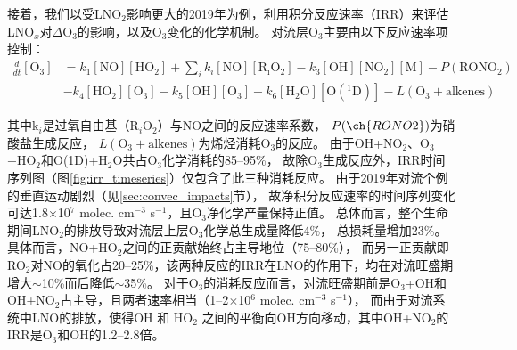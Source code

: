 
接着，我们以受LNO$_2$影响更大的2019年为例，利用积分反应速率（IRR）来评估LNO$_x$对$\Delta$O$_3$的影响，以及O$_3$变化的化学机制。
对流层O$_3$主要由以下反应速率项控制\citep{Mazzuca.2016}：
{
\abovedisplayskip=3pt%
\belowdisplayskip=3pt%
\begingroup
\allowdisplaybreaks
\begin{align}
  \frac{d}{dt}[\mathrm{O_3}] &= k_1[\mathrm{NO}][\mathrm{HO_2}] + \sum_{i}  k_i[\mathrm{NO}][\mathrm{R_iO_2}] - k_3[\mathrm{OH}][\mathrm{NO_2}][\mathrm{M}] - P(\mathrm{RONO_2}) \nonumber \\
                             & - k_4[\mathrm{HO_2}][\mathrm{O_3}] - k_5[\mathrm{OH}][\mathrm{O_3}] - k_6[\mathrm{H_2O}][\mathrm{O(^1D)}] - L(\mathrm{O_3+alkenes})
\end{align}
\endgroup
}

其中k$_i$是过氧自由基（R$_i$O$_2$）与NO之间的反应速率系数，
$P(\ch{RONO2})$为硝酸盐生成反应，
$L(\mathrm{O_3+alkenes})$为烯烃消耗O$_3$的反应。
由于OH+NO$_2$、O$_3$+HO$_2$和O(1D)+H$_2$O共占O$_3$化学消耗的85--95\%，
故除O$_3$生成反应外，IRR时间序列图（图\ref{fig:irr_timeseries}）仅包含了此三种消耗反应。
由于2019年对流个例的垂直运动剧烈（见\ref{sec:convec_impacts}节），
故净积分反应速率的时间序列变化可达1.8$\times$10$^7$ molec. cm$^{-3}$ s$^{-1}$，且O$_3$净化学产量保持正值。
总体而言，整个生命期间LNO$_2$的排放导致对流层上层O$_3$化学总生成量降低4\%，
总损耗量增加23\%。
具体而言，NO+HO$_2$之间的正贡献始终占主导地位（75--80\%），
而另一正贡献即RO$_2$对NO的氧化占20--25\%，该两种反应的IRR在LNO的作用下，均在对流旺盛期增大$\sim$10\%而后降低$\sim$35\%。
对于O$_3$的消耗反应而言，对流旺盛期前是O$_3$+OH和OH+NO$_2$占主导，且两者速率相当（1--2$\times$10$^6$ molec. cm$^{-3}$ s$^{-1}$），
而由于对流系统中LNO的排放，使得OH 和 HO$_2$ 之间的平衡向OH方向移动，其中OH+NO$_2$的IRR是O$_3$和OH的1.2--2.8倍。


